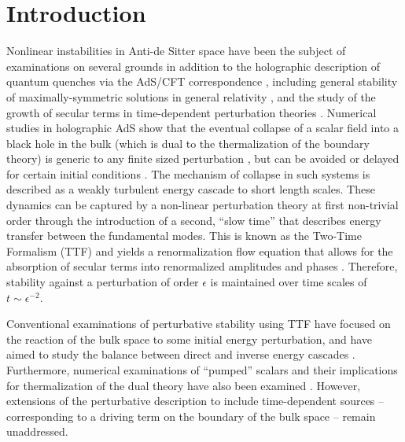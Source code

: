\documentclass[../PhD.tex]{subfiles}
\begin{document}

\section{Introduction}

Nonlinear instabilities in Anti-de Sitter space have been the subject of examinations on several grounds in addition to  the holographic description of quantum quenches via the AdS/CFT correspondence \cite{ 1708.05600, 1501.00007}, including general stability of maximally-symmetric solutions in general relativity \cite{1104.3702, 1208.5772, 1706.06101}, and the study of the growth of secular terms in time-dependent perturbation theories \cite{hep-th/9506161, 1305.4117}. Numerical studies in holographic AdS show that the eventual collapse of a scalar field into a black hole in the bulk (which is dual to the thermalization of the boundary theory) is generic to any finite sized perturbation \cite{1104.3702, 1106.2339, 1108.4539}, but can be avoided or delayed for certain initial conditions \cite{1803.02830, 1711.00454, 1706.07413, 1508.02709}. The mechanism of collapse in such systems is described as a weakly turbulent energy cascade to short length scales. These dynamics can be captured by a non-linear perturbation theory at first non-trivial order through the introduction of a second, ``slow time'' that describes energy transfer between the fundamental modes. This is known as the Two-Time Formalism (TTF) \cite{1403.6471} and yields a renormalization flow equation that allows for the absorption of secular terms into renormalized amplitudes and phases \cite{1508.05474, 1407.6273, 1412.3249, 1508.04943}. Therefore, stability against a perturbation of order $\epsilon$ is maintained over time scales of $t \sim \epsilon^{-2}$.

Conventional examinations of perturbative stability using TTF have focused on the reaction of the bulk space to some initial energy perturbation, and have aimed to study the balance between direct and inverse energy cascades \cite{1606.02712, 1612.04758, 1602.05859, 1507.08261, 1607.08094}. Furthermore, numerical examinations of ``pumped'' scalars and their implications for thermalization of the dual theory have also been examined \cite{1308.2132, 1410.6201, 1712.07637, 1612.07701, 1502.05726, 1706.02438}. However, extensions of the perturbative description to include time-dependent sources -- corresponding to a driving term on the boundary of the bulk space -- remain unaddressed. 
\end{document}
